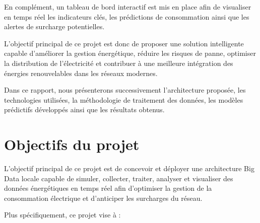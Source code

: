 \documentclass[1pt,a4paper]{report}
\begin{document}
En complément, un tableau de bord interactif est mis en place afin de visualiser en temps réel les indicateurs clés, les prédictions de consommation ainsi que les alertes de surcharge potentielles.

L’objectif principal de ce projet est donc de proposer une solution intelligente capable d’améliorer la gestion énergétique, réduire les risques de panne, optimiser la distribution de l’électricité et contribuer à une meilleure intégration des énergies renouvelables dans les réseaux modernes.

Dans ce rapport, nous présenterons successivement l’architecture proposée, les technologies utilisées, la méthodologie de traitement des données, les modèles prédictifs développés ainsi que les résultats obtenus.

\chapter{Objectifs du projet}

L’objectif principal de ce projet est de concevoir et déployer une architecture Big Data locale capable de simuler, collecter, traiter, analyser et visualiser des données énergétiques en temps réel afin d’optimiser la gestion de la consommation électrique et d’anticiper les surcharges du réseau.

Plus spécifiquement, ce projet vise à :
\end{document}
